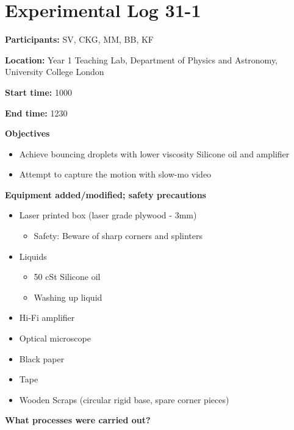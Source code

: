 
\section{Experimental Log 31-1}

\textbf{Participants:} SV, CKG, MM, BB, KF

\textbf{Location:} Year 1 Teaching Lab, Department of Physics and Astronomy, University College London

\textbf{Start time:} 1000

\textbf{End time:} 1230
\bigskip

\textbf{Objectives}

\begin{itemize}
\item Achieve bouncing droplets with lower viscosity Silicone oil and amplifier
\item Attempt to capture the motion with slow-mo video
\end{itemize}
\bigskip

\textbf{Equipment added/modified; safety precautions}

\begin{itemize}
\item Laser printed box (laser grade plywood - 3mm)

\begin{itemize}
\item Safety: Beware of sharp corners and splinters
\end{itemize}
\item Liquids

\begin{itemize}
\item 50 cSt Silicone oil
\item Washing up liquid
\end{itemize}
\item Hi-Fi amplifier
\item Optical microscope
\item Black paper
\item Tape
\item Wooden Scraps (circular rigid base, spare corner pieces)
\end{itemize}

\bigskip

\textbf{What processes were carried out?}

